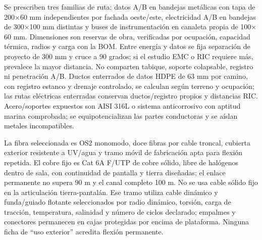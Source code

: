 Se prescriben tres familias de ruta: datos A/B en bandejas metálicas con tapa de 200$\times$60 mm independientes por fachada oeste/este, electricidad A/B en bandejas de 300$\times$100 mm distintas y buses de instrumentación en canaleta propia de 100$\times$60 mm. Dimensiones son reservas de obra, verificadas por ocupación, capacidad térmica, radios y carga con la BOM. Entre energía y datos se fija separación de proyecto de 300 mm y cruce a 90 grados; si el estudio EMC o RIC requiere más, prevalece la mayor distancia. No comparten tabique, soporte colapsable, registro ni penetración A/B. Ductos enterrados de datos HDPE de 63 mm por camino, con registro estanco y drenaje controlado, se calculan según terreno y ocupación; las rutas eléctricas enterradas conservan ductos/registro propios y distancias RIC. Acero/soportes expuestos son AISI 316L o sistema anticorrosivo con aptitud marina comprobada; se equipotencializan las partes conductoras y se aíslan metales incompatibles.

La fibra seleccionada es OS2 monomodo, doce fibras por cable troncal, cubierta exterior resistente a UV/agua y tramo móvil de fabricación apta para flexión repetida. El cobre fijo es Cat 6A F/UTP de cobre sólido, libre de halógenos dentro de sala, con continuidad de pantalla y tierra diseñadas; el enlace permanente no supera 90 m y el canal completo 100 m. No se usa cable sólido fijo en la articulación tierra-pantalán. Ese tramo utiliza cable dinámico y funda/guiado flotante seleccionados por radio dinámico, torsión, carga de tracción, temperatura, salinidad y número de ciclos declarado; empalmes y conectores permanecen en cajas protegidas por encima de plataforma. Ninguna ficha de ``uso exterior'' acredita flexión permanente.

